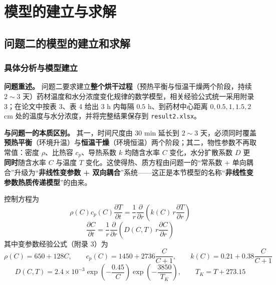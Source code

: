 \section{模型的建立与求解}



\subsection{问题二的模型的建立和求解}

\subsubsection{具体分析与模型建立}

\textbf{问题重述。} 问题二要求建立\textbf{整个烘干过程}（预热平衡与恒温干燥两个阶段，持续 $2\sim3$ 天）药材温度和水分浓度变化规律的数学模型，相关经验公式统一采用附录 3；在论文中按表 3、表 4 给出 $3$ h 内每隔 $0.5$ h、到药材中心距离 $0,0.5,1,1.5,2$ cm 处的温度与水分浓度，并将完整结果保存到 \texttt{result2.xlsx}。

\textbf{与问题一的本质区别。} 其一，时间尺度由 $30$ min 延长到 $2\sim3$ 天，必须同时覆盖\textbf{预热平衡}（环境升温）与\textbf{恒温干燥}（环境恒温）两个阶段；其二，物性参数不再取常值：密度 $\rho$、比热容 $c_p$、导热系数 $k$ 均随含水率 $C$ 变化，水分扩散系数 $D$ 更\textbf{同时}随含水率 $C$ 与温度 $T$ 变化。这使得热、质方程由问题一的“常系数 + 单向耦合”升级为“\textbf{非线性变参数 + 双向耦合}”系统——这正是本节模型的名称“\textbf{非线性变参数热质传递模型}”的由来。

控制方程为
\begin{equation}
  \rho(C)c_p(C)\frac{\partial T}{\partial t}=\frac{1}{r}\frac{\partial}{\partial r}\left(k(C)\,r\frac{\partial T}{\partial r}\right)
  \label{eq:p2_heat}
\end{equation}
\begin{equation}
  \frac{\partial C}{\partial t}=\frac{1}{r}\frac{\partial}{\partial r}\left(D(C,T)\,r\frac{\partial C}{\partial r}\right)
  \label{eq:p2_mass}
\end{equation}
其中变参数经验公式（附录 3）为
\begin{equation}
  \rho(C)=650+128C,\qquad
  c_p(C)=1450+2736\frac{C}{C+1},\qquad
  k(C)=0.21+0.38\frac{C}{C+1}
  \label{eq:p2_param}
\end{equation}
\begin{equation}
  D(C,T)=2.4\times10^{-3}\exp\!\left(-\frac{0.45}{C}\right)\exp\!\left(-\frac{3850}{T_K}\right),\qquad T_K=T+273.15
  \label{eq:p2_D}
\end{equation}

